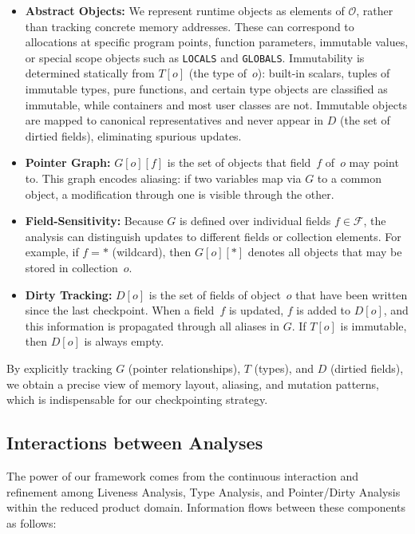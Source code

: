 \begin{itemize}
    \item \textbf{Abstract Objects:}
    We represent runtime objects as elements of $\mathcal{O}$, rather than tracking
    concrete memory addresses. These can correspond to allocations at specific program
    points, function parameters, immutable values, or special scope objects such as
    \texttt{LOCALS} and \texttt{GLOBALS}.  
    Immutability is determined statically from $T[o]$ (the type of~$o$): 
    built-in scalars, tuples of immutable types, pure functions, and certain type objects
    are classified as immutable, while containers and most user classes are not.
    Immutable objects are mapped to canonical representatives and never appear in $D$
    (the set of dirtied fields), eliminating spurious updates.

    \item \textbf{Pointer Graph:}
    $G[o][f]$ is the set of objects that field~$f$ of~$o$ may point to.
    This graph encodes aliasing: if two variables map via $G$ to a common object,
    a modification through one is visible through the other.

    \item \textbf{Field-Sensitivity:}
    Because $G$ is defined over individual fields $f \in \mathcal{F}$, 
    the analysis can distinguish updates to different fields or collection elements.
    For example, if $f = \texttt{*}$ (wildcard), then $G[o][\texttt{*}]$ denotes
    all objects that may be stored in collection~$o$.

    \item \textbf{Dirty Tracking:}
    $D[o]$ is the set of fields of object~$o$ that have been written since the last
    checkpoint. When a field~$f$ is updated, $f$ is added to $D[o]$, and this information
    is propagated through all aliases in $G$.
    If $T[o]$ is immutable, then $D[o]$ is always empty.
\end{itemize}

By explicitly tracking $G$ (pointer relationships), $T$ (types), and $D$ (dirtied fields),
we obtain a precise view of memory layout, aliasing, and mutation patterns,
which is indispensable for our checkpointing strategy.

\subsection{Interactions between Analyses}

The power of our framework comes from the continuous interaction and refinement among
Liveness Analysis, Type Analysis, and Pointer/Dirty Analysis within the reduced product domain.
Information flows between these components as follows:

